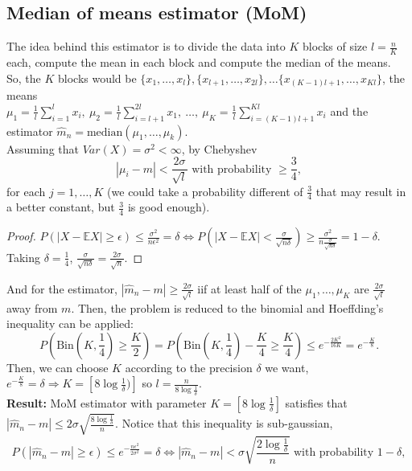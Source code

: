 \documentclass[11pt, english]{article}
\begin{document}
\subsection{Median of means estimator (MoM)}

The idea behind this estimator is to divide the data into $K$ blocks of size $l=\frac{n}{K}$ each, compute the mean in each block and compute the median of the means. \\

So, the $K$ blocks would be $\{x_1,\dots,x_l\},\{x_{l+1},\dots,x_{2l}\},\dots\{x_{(K-1)l+1},\dots,x_{Kl}\}$, the means\\ $\mu_1=\frac{1}{l}\sum\limits_{i=1}^l x_i,\ \mu_2=\frac{1}{l}\sum\limits_{i=l+1}^{2l}x_1,\ \dots,\ \mu_K=\frac{1}{l}\sum\limits_{i=(K-1)l+1}^{Kl}x_i$ and the estimator $\hat{m}_n=\text{median}(\mu_1,\dots,\mu_k)$.\\

Assuming that $Var(X)=\sigma^2<\infty$, by Chebyshev 
\begin{equation}
	|\mu_i-m|< \frac{2\sigma}{\sqrt{l}}\text{ with probability }\geq \frac{3}{4},
\end{equation}
for each $j=1,\dots,K$ (we could take a probability different of $\frac{3}{4}$ that may result in a better constant, but $\frac{3}{4}$ is good enough). 
\begin{proof}
	$P(|X-\mathbb{E}X|\geq\epsilon)\leq\frac{\sigma^2}{n\epsilon^2}=\delta\Leftrightarrow P(|X-\mathbb{E}X|<\frac{\sigma}{\sqrt{n\delta}}) \geq \frac{\sigma^2}{n\frac{\sigma}{\sqrt{n\delta}}} = 1-\delta$. Taking $\delta=\frac{1}{4}$, $\frac{\sigma}{\sqrt{n\delta}}=\frac{2\sigma}{\sqrt{n}}$.
\end{proof}
And for the estimator, $|\hat{m}_n-m|\geq \frac{2\sigma}{\sqrt{l}}$ iif at least half of the $\mu_1,\dots,\mu_K$ are $\frac{2\sigma}{\sqrt{l}}$ away from $m$. Then, the problem is reduced to the binomial and Hoeffding's inequality can be applied:
\begin{equation}
	P(\text{Bin}(K,\frac{1}{4})\geq \frac{K}{2})=P(\text{Bin}(K,\frac{1}{4})-\frac{K}{4}\geq \frac{K}{4})\leq e^{-\frac{2K^2}{16K}}=e^{-\frac{K}{8}}.
\end{equation} 
Then, we can choose $K$ according to the precision $\delta$ we want, $e^{-\frac{K}{8}}=\delta\Rightarrow K=[8\log\frac{1}{\delta})]$ so $l=\frac{n}{8\log\frac{1}{\delta}}$.\\

\textbf{Result:} MoM estimator with parameter $K=[8\log\frac{1}{\delta}]$ satisfies that $|\hat{m}_n-m|\leq 2\sigma\sqrt{\frac{8\log\frac{1}{\delta}}{n}}$. Notice that this inequality is sub-gaussian, 
\begin{equation}
	P(|\hat{m}_n-m|\geq\epsilon)\leq e^{-\frac{n\epsilon^2}{2\sigma^2}}=\delta\Leftrightarrow |\hat{m}_n-m|<\sigma\sqrt{\frac{2\log\frac{1}{\delta}}{n}}\text{ with probability }1-\delta,
\end{equation} 
\end{document}
